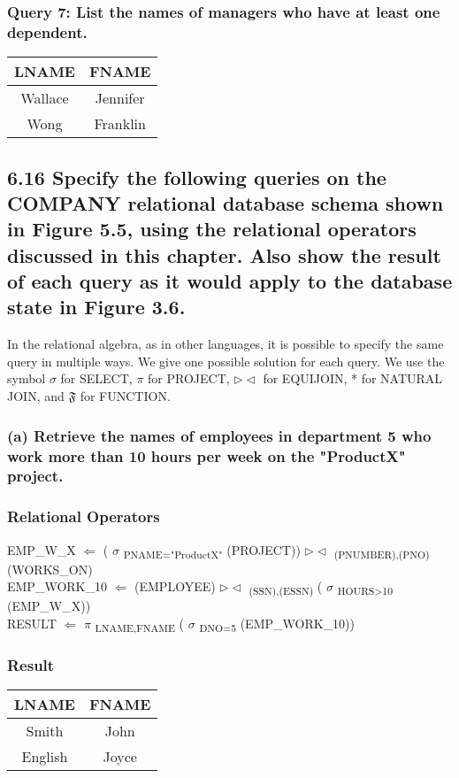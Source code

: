 \documentclass[11pt, oneside]{article}   	%
\begin{document}
\subsubsection*{Query 7: List the names of managers who have at least one dependent.}
\begin{center}
\begin{tabular}{ c | c }
  LNAME & FNAME \\ \hline
  Wallace & Jennifer \\
  Wong & Franklin \\
\end{tabular}
\end{center}

\subsection*{6.16 Specify the following queries on the COMPANY relational database schema shown in Figure 5.5, using the relational operators discussed in this chapter. Also show the result of each query as it would apply to the database state in Figure 3.6.}
In the relational algebra, as in other languages, it is possible to specify the same query in multiple ways. We give one possible solution for each query. We use the symbol $\sigma$ for SELECT, $\pi$ for PROJECT, $\rhd\lhd$ for EQUIJOIN, * for NATURAL JOIN, and $\mathfrak{F}$ for FUNCTION.

\subsubsection*{(a) Retrieve the names of employees in department 5 who work more than 10 hours per week on the "ProductX" project.}
\subsubsection*{Relational Operators}
EMP\_W\_X $\Leftarrow$ ( $\sigma$ \textsubscript{PNAME="ProductX"} (PROJECT)) $\rhd\lhd$ \textsubscript{(PNUMBER),(PNO)} (WORKS\_ON) \\
EMP\_WORK\_10 $\Leftarrow$ (EMPLOYEE) $\rhd\lhd$ \textsubscript{(SSN),(ESSN)} ( $\sigma$ \textsubscript{HOURS>10} (EMP\_W\_X)) \\
RESULT $\Leftarrow$ $\pi$ \textsubscript{LNAME,FNAME} ( $\sigma$ \textsubscript{DNO=5} (EMP\_WORK\_10))

\subsubsection*{Result}
\begin{center}
\begin{tabular}{ c | c }
  LNAME & FNAME \\ \hline
  Smith & John \\
  English & Joyce \\
\end{tabular}
\end{center}
\end{document}
